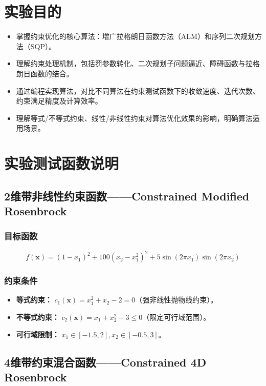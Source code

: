 \documentclass[a4paper,12pt]{article}
\begin{document}
\section{实验目的}
\begin{itemize}
    \item 掌握约束优化的核心算法：增广拉格朗日函数方法（ALM）和序列二次规划方法（SQP）。
    \item 理解约束处理机制，包括罚参数转化、二次规划子问题逼近、障碍函数与拉格朗日函数的结合。
    \item 通过编程实现算法，对比不同算法在约束测试函数下的收敛速度、迭代次数、约束满足精度及计算效率。
    \item 理解等式/不等式约束、线性/非线性约束对算法优化效果的影响，明确算法适用场景。
\end{itemize}

\section{实验测试函数说明}

\subsection{2维带非线性约束函数——Constrained Modified Rosenbrock}

\subsubsection{目标函数}
\begin{equation}
    f(\bm{x}) = (1 - x_1)^2 + 100(x_2 - x_1^2)^2 + 5 \sin(2\pi x_1) \sin(2\pi x_2)
\end{equation}

\subsubsection{约束条件}
\begin{itemize}
    \item \textbf{等式约束：} $c_1(\bm{x}) = x_1^2 + x_2 - 2 = 0$（强非线性抛物线约束）。
    \item \textbf{不等式约束：} $c_2(\bm{x}) = x_1 + x_2^2 - 3 \le 0$（限定可行域范围）。
    \item \textbf{可行域限制：} $x_1 \in [-1.5, 2], x_2 \in [-0.5, 3]$。
\end{itemize}

\subsection{4维带约束混合函数——Constrained 4D Rosenbrock}
\end{document}
